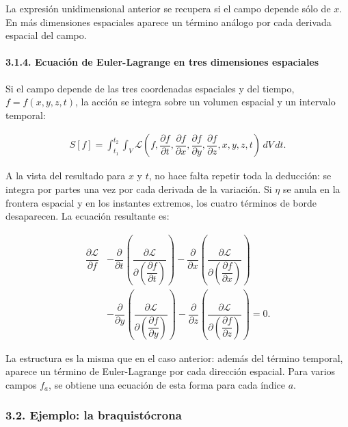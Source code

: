 \documentclass[
  spanish,
]{article}
\begin{document}
La expresión unidimensional anterior se recupera si el campo depende
sólo de \(x\). En más dimensiones espaciales aparece un término análogo
por cada derivada espacial del campo.

\paragraph{3.1.4. Ecuación de Euler-Lagrange en tres dimensiones
espaciales}\label{ecuaciuxf3n-de-euler-lagrange-en-tres-dimensiones-espaciales}

Si el campo depende de las tres coordenadas espaciales y del tiempo,
\(f=f(x,y,z,t)\), la acción se integra sobre un volumen espacial y un
intervalo temporal:

\[
\begin{aligned}
S[f]
= \int_{t_1}^{t_2}\int_V
\mathcal{L}\left(
f,
\dfrac{\partial f}{\partial t},
\dfrac{\partial f}{\partial x},
\dfrac{\partial f}{\partial y},
\dfrac{\partial f}{\partial z},
x,y,z,t
\right)\,dV\,dt.
\end{aligned}
\]

A la vista del resultado para \(x\) y \(t\), no hace falta repetir toda
la deducción: se integra por partes una vez por cada derivada de la
variación. Si \(\eta\) se anula en la frontera espacial y en los
instantes extremos, los cuatro términos de borde desaparecen. La
ecuación resultante es:

\[
\begin{aligned}
\dfrac{\partial\mathcal{L}}{\partial f}
&- \dfrac{\partial}{\partial t}
\left(\dfrac{\partial\mathcal{L}}{\partial\left(\dfrac{\partial f}{\partial t}\right)}\right)
- \dfrac{\partial}{\partial x}
\left(\dfrac{\partial\mathcal{L}}{\partial\left(\dfrac{\partial f}{\partial x}\right)}\right) \\
&- \dfrac{\partial}{\partial y}
\left(\dfrac{\partial\mathcal{L}}{\partial\left(\dfrac{\partial f}{\partial y}\right)}\right)
- \dfrac{\partial}{\partial z}
\left(\dfrac{\partial\mathcal{L}}{\partial\left(\dfrac{\partial f}{\partial z}\right)}\right)
= 0.
\end{aligned}
\]

La estructura es la misma que en el caso anterior: además del término
temporal, aparece un término de Euler-Lagrange por cada dirección
espacial. Para varios campos \(f_a\), se obtiene una ecuación de esta
forma para cada índice \(a\).

\subsubsection{3.2. Ejemplo: la
braquistócrona}\label{ejemplo-la-braquistuxf3crona}
\end{document}

